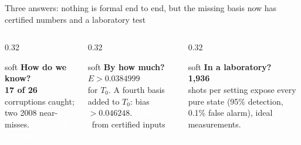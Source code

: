 \documentclass[aspectratio=169,11pt,t]{beamer}
\newcommand{\tg}[2]{{\setlength{\fboxsep}{1.2pt}\colorbox{#1}{\textcolor{white}{\sffamily\bfseries\footnotesize\,#2\,}}}}
\newcommand{\Tproved}{\tg{cProved}{proved}}
\newcommand{\Tcert}{\tg{cCert}{certified / computed}}
\begin{document}
\begin{frame}{Three answers: nothing is formal end to end, but the missing basis now has certified numbers and a laboratory test}
\small
\begin{columns}[T]
\begin{column}{0.32\textwidth}
\begin{beamercolorbox}[wd=\textwidth,sep=4pt,rounded=true]{soft}
{\color{accent}\bfseries How do we know?}\\[4pt]
{\Large\bfseries\color{accent}17 of 26}\\[3pt]
corruptions caught; two 2008 near-misses. \Tcert
\end{beamercolorbox}
\end{column}
\begin{column}{0.32\textwidth}
\begin{beamercolorbox}[wd=\textwidth,sep=4pt,rounded=true]{soft}
{\color{accent}\bfseries By how much?}\\[4pt]
{\Large\bfseries\color{accent}$E>0.0384999$}\\[3pt]
for $T_0$. A fourth basis added to $T_0$: bias $>0.046248$. \Tproved\ from certified inputs
\end{beamercolorbox}
\end{column}
\begin{column}{0.32\textwidth}
\begin{beamercolorbox}[wd=\textwidth,sep=4pt,rounded=true]{soft}
{\color{accent}\bfseries In a laboratory?}\\[4pt]
{\Large\bfseries\color{accent}1,936}\\[3pt]
shots per setting expose every pure state (95\% detection, 0.1\% false alarm), ideal measurements. \Tproved
\end{beamercolorbox}
\end{column}
\end{columns}
\end{frame}
\end{document}
